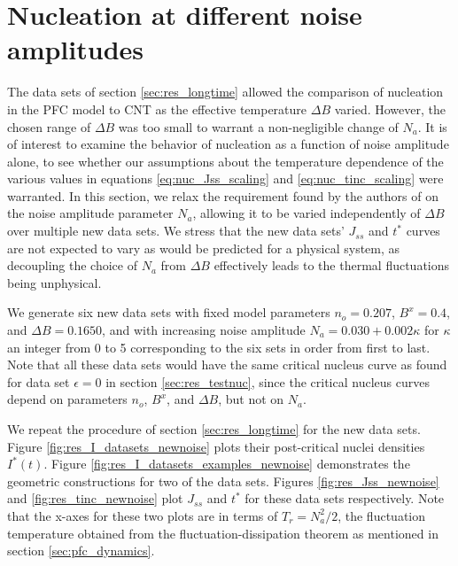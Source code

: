 \section{Nucleation at different noise amplitudes}\label{sec:res_diffnoise}

The data sets of section \ref{sec:res_longtime} allowed the comparison of nucleation in the PFC model to CNT as the effective temperature $\Delta B$ varied. However, the chosen range of $\Delta B$ was too small to warrant a non-negligible change of $N_a$. It is of interest to examine the behavior of nucleation as a function of noise amplitude alone, to see whether our assumptions about the temperature dependence of the various values in equations \ref{eq:nuc_Jss_scaling} and \ref{eq:nuc_tinc_scaling} were warranted. In this section, we relax the requirement found by the authors of \cite{kocher16} on the noise amplitude parameter $N_a$, allowing it to be varied independently of $\Delta B$ over multiple new data sets. We stress that the new data sets' $J_{ss}$ and $t^*$ curves are not expected to vary as would be predicted for a physical system, as decoupling the choice of $N_a$ from $\Delta B$ effectively leads to the thermal fluctuations being unphysical.

We generate six new data sets with fixed model parameters $n_o=0.207$, $B^x=0.4$, and $\Delta B=0.1650$, and with increasing noise amplitude $N_a=0.030+0.002\kappa$ for $\kappa$ an integer from 0 to 5 corresponding to the six sets in order from first to last. Note that all these data sets would have the same critical nucleus curve as found for data set $\epsilon=0$ in section \ref{sec:res_testnuc}, since the critical nucleus curves depend on parameters $n_o$, $B^x$, and $\Delta B$, but not on $N_a$.

We repeat the procedure of section \ref{sec:res_longtime} for the new data sets. Figure \ref{fig:res_I_datasets_newnoise} plots their post-critical nuclei densities $I^*(t)$. Figure \ref{fig:res_I_datasets_examples_newnoise} demonstrates the geometric constructions for two of the data sets. Figures \ref{fig:res_Jss_newnoise} and \ref{fig:res_tinc_newnoise} plot $J_{ss}$ and $t^*$ for these data sets respectively. Note that the x-axes for these two plots are in terms of $T_r=N_a^2/2$, the fluctuation temperature obtained from the fluctuation-dissipation theorem as mentioned in section \ref{sec:pfc_dynamics}.


